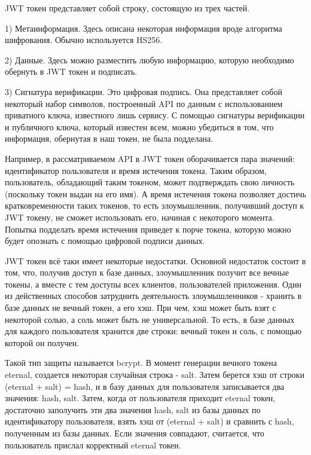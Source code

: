 \documentclass[14pt]{extarticle}
\begin{document}
    JWT токен представляет собой строку, состоящую из трех частей.

    1) Метаинформация.
    Здесь описана некоторая информация вроде алгоритма шифрования.
    Обычно используется HS256.

    2) Данные.
    Здесь можно разместить любую информацию, которую необходимо обернуть в JWT токен и подписать.

    3) Сигнатура верификации.
    Это цифровая подпись. Она представляет собой некоторый набор символов, построенный API по данным
    с использованием приватного ключа, известного лишь сервису. С помощью сигнатуры верификации и публичного ключа, который
    известен всем, можно убедиться в том, что информация, обернутая в наш токен, не была подделана.

    Например, в рассматриваемом API в JWT токен оборачивается пара значений: идентификатор пользователя и время истечения токена.
    Таким образом,
    пользователь, обладающий таким токеном, может подтверждать свою личность
    (поскольку токен выдан на его имя). А время истечения токена позволяет достичь кратковременности таких
    токенов, то есть злоумышленник, получивший доступ к JWT токену, не сможет использовать его, начиная с некоторого момента.
    Попытка подделать время истечения приведет к порче токена, которую можно будет опознать с помощью цифровой подписи данных.

    JWT токен всё таки имеет некоторые недостатки. Основной недостаток состоит в том, что, получив доступ к базе данных, злоумышленник получит все вечные токены,
    а вместе с тем доступы всех клиентов, пользователей приложения.
    Один из действенных способов затруднить деятельность злоумышленников - хранить в базе данных не вечный токен, а
    его хэш. При чем, хэш может быть взят с некоторой солью, а соль может быть не универсальной. То есть, в базе данных
    для каждого пользователя хранится две строки: вечный токен и соль, с помощью которой он получен.

    Такой тип защиты называется bcrypt. В момент генерации вечного токена eternal, создается некоторая случайная строка - salt.
    Затем берется хэш от строки (eternal + salt) = hash, и в базу данных для пользователя записывается два значения: hash, salt.
    Затем, когда от пользователя приходит eternal токен, достаточно заполучить эти два значения hash, salt из базы данных
    по идентификатору пользователя, взять хэш от (eternal + salt) и сравнить с hash, полученным из базы данных.
    Если значения совпадают, считается, что пользователь прислал корректный eternal токен.
\end{document}
